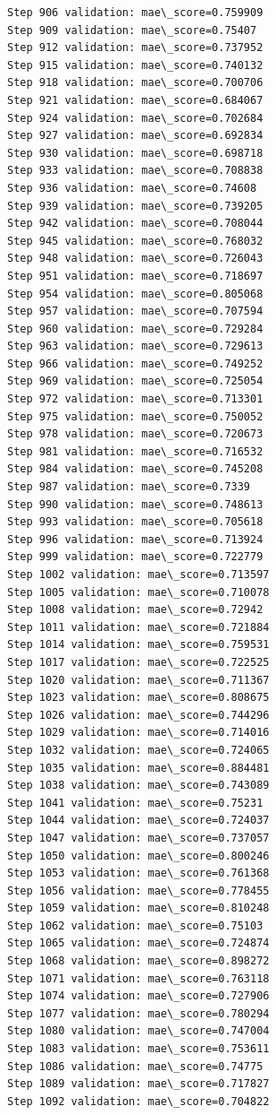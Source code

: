 \documentclass[11pt]{article}
\begin{document}
\begin{Verbatim}[commandchars=\\\{\}]
Step 906 validation: mae\_score=0.759909
Step 909 validation: mae\_score=0.75407
Step 912 validation: mae\_score=0.737952
Step 915 validation: mae\_score=0.740132
Step 918 validation: mae\_score=0.700706
Step 921 validation: mae\_score=0.684067
Step 924 validation: mae\_score=0.702684
Step 927 validation: mae\_score=0.692834
Step 930 validation: mae\_score=0.698718
Step 933 validation: mae\_score=0.708838
Step 936 validation: mae\_score=0.74608
Step 939 validation: mae\_score=0.739205
Step 942 validation: mae\_score=0.708044
Step 945 validation: mae\_score=0.768032
Step 948 validation: mae\_score=0.726043
Step 951 validation: mae\_score=0.718697
Step 954 validation: mae\_score=0.805068
Step 957 validation: mae\_score=0.707594
Step 960 validation: mae\_score=0.729284
Step 963 validation: mae\_score=0.729613
Step 966 validation: mae\_score=0.749252
Step 969 validation: mae\_score=0.725054
Step 972 validation: mae\_score=0.713301
Step 975 validation: mae\_score=0.750052
Step 978 validation: mae\_score=0.720673
Step 981 validation: mae\_score=0.716532
Step 984 validation: mae\_score=0.745208
Step 987 validation: mae\_score=0.7339
Step 990 validation: mae\_score=0.748613
Step 993 validation: mae\_score=0.705618
Step 996 validation: mae\_score=0.713924
Step 999 validation: mae\_score=0.722779
Step 1002 validation: mae\_score=0.713597
Step 1005 validation: mae\_score=0.710078
Step 1008 validation: mae\_score=0.72942
Step 1011 validation: mae\_score=0.721884
Step 1014 validation: mae\_score=0.759531
Step 1017 validation: mae\_score=0.722525
Step 1020 validation: mae\_score=0.711367
Step 1023 validation: mae\_score=0.808675
Step 1026 validation: mae\_score=0.744296
Step 1029 validation: mae\_score=0.714016
Step 1032 validation: mae\_score=0.724065
Step 1035 validation: mae\_score=0.884481
Step 1038 validation: mae\_score=0.743089
Step 1041 validation: mae\_score=0.75231
Step 1044 validation: mae\_score=0.724037
Step 1047 validation: mae\_score=0.737057
Step 1050 validation: mae\_score=0.800246
Step 1053 validation: mae\_score=0.761368
Step 1056 validation: mae\_score=0.778455
Step 1059 validation: mae\_score=0.810248
Step 1062 validation: mae\_score=0.75103
Step 1065 validation: mae\_score=0.724874
Step 1068 validation: mae\_score=0.898272
Step 1071 validation: mae\_score=0.763118
Step 1074 validation: mae\_score=0.727906
Step 1077 validation: mae\_score=0.780294
Step 1080 validation: mae\_score=0.747004
Step 1083 validation: mae\_score=0.753611
Step 1086 validation: mae\_score=0.74775
Step 1089 validation: mae\_score=0.717827
Step 1092 validation: mae\_score=0.704822

\end{Verbatim}
\end{document}
